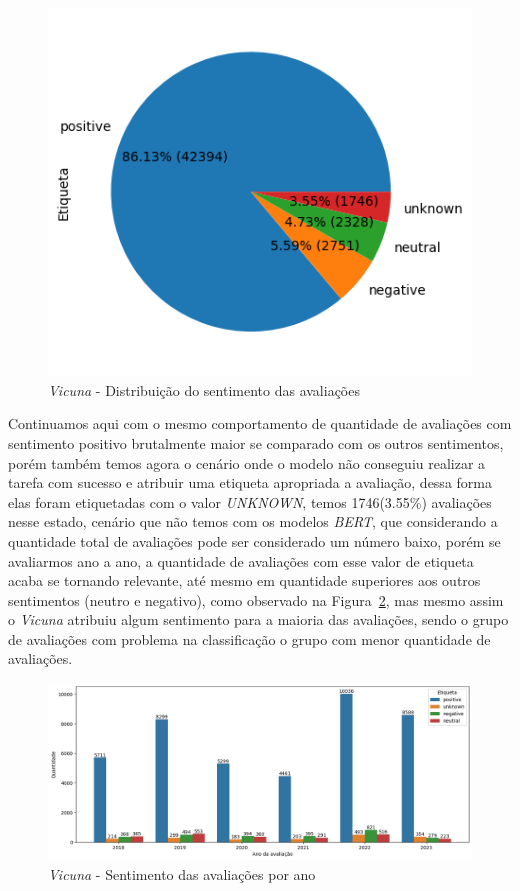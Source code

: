 \begin{figure}
	\centering
	\includegraphics{figs/vicuna/distribuicao_pizza.png}
	\caption{\textit{Vicuna} - Distribuição do sentimento das avaliações}
	\label{img:vicuna_pizza_distribuicao}
\end{figure}

Continuamos aqui com o mesmo comportamento de quantidade de avaliações com sentimento positivo brutalmente maior se comparado com os outros sentimentos, porém também temos agora o cenário onde o modelo não conseguiu realizar a tarefa com sucesso e atribuir uma etiqueta apropriada a avaliação, dessa forma elas foram etiquetadas com o valor \textit{UNKNOWN}, temos 1746(3.55\%) avaliações nesse estado, cenário que não temos com os modelos \textit{BERT}, que considerando a quantidade total de avaliações pode ser considerado um número baixo, porém se avaliarmos ano a ano, a quantidade de avaliações com esse valor de etiqueta acaba se tornando relevante, até mesmo em quantidade superiores aos outros sentimentos (neutro e negativo), como observado na Figura~\ref{img:vicuna_sentimento_ano}, mas mesmo assim o \textit{Vicuna} atribuiu algum sentimento para a maioria das avaliações, sendo o grupo de avaliações com problema na classificação o grupo com menor quantidade de avaliações.

\begin{figure}
	\centering
	\includegraphics[width=1\textwidth]{figs/vicuna/sentimento_ano.png}
	\caption{\textit{Vicuna} - Sentimento das avaliações por ano}
	\label{img:vicuna_sentimento_ano}
\end{figure}

